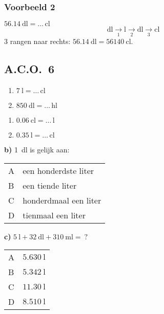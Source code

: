 \documentclass[a4paper,12pt]{article}
\begin{document}
\subsubsection*{Voorbeeld 2}
\(\SI{56.14}{\deca\litre}=\ldots\,\si{\centi\litre}\)\\
\[
\si{\deca\litre} \xrightarrow[1]{}\si{\litre} \xrightarrow[2]{}\si{\deci\litre} \xrightarrow[3]{}\si{\centi\litre}
\]
3 rangen naar rechts: \(\SI{56.14}{\deca\litre}=\SI{56140}{\centi\litre}\).

\subsection*{A.C.O.~6}
\begin{multicols}{2}
\begin{enumerate}
  \item \(\SI{7}{\litre}=\ldots\,\si{\centi\litre}\)
  \item \(\SI{850}{\deci\litre}=\ldots\,\si{\hecto\litre}\)
\end{enumerate}
\columnbreak
\begin{enumerate}[start=3]
  \item \(\SI{0.06}{\centi\litre}=\ldots\,\si{\litre}\)
  \item \(\SI{0.35}{\litre}=\ldots\,\si{\centi\litre}\)
\end{enumerate}
\end{multicols}

\noindent\textbf{b)} \SI{1}{\deci\litre} is gelijk aan:\\
\begin{tabular}{@{}ll@{}}
A & een honderdste liter \\
B & een tiende liter \\
C & honderdmaal een liter \\
D & tienmaal een liter \\
\end{tabular}

\medskip
\noindent\textbf{c)} \(\SI{5}{\litre}+\SI{32}{\deci\litre}+\SI{310}{\milli\litre}=\ ?\)\\
\begin{tabular}{@{}ll@{}}
A & \(\SI{5.630}{\litre}\) \\
B & \(\SI{5.342}{\litre}\) \\
C & \(\SI{11.30}{\litre}\) \\
D & \(\SI{8.510}{\litre}\) \\
\end{tabular}
\end{document}
